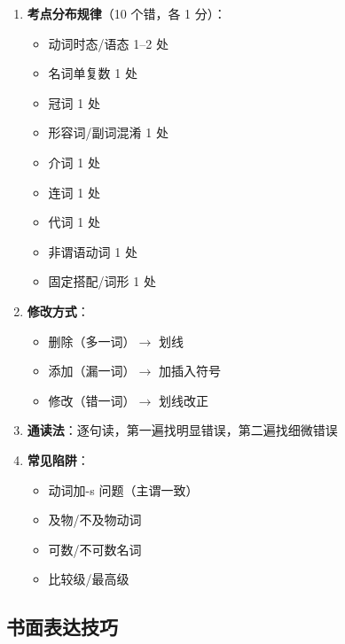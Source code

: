 \begin{enumerate}
  \item \textbf{考点分布规律}（10 个错，各 1 分）：
    \begin{itemize}
      \item 动词时态/语态 1--2 处
      \item 名词单复数 1 处
      \item 冠词 1 处
      \item 形容词/副词混淆 1 处
      \item 介词 1 处
      \item 连词 1 处
      \item 代词 1 处
      \item 非谓语动词 1 处
      \item 固定搭配/词形 1 处
    \end{itemize}
  \item \textbf{修改方式}：
    \begin{itemize}
      \item 删除（多一词）$\rightarrow$ 划线
      \item 添加（漏一词）$\rightarrow$ 加插入符号
      \item 修改（错一词）$\rightarrow$ 划线改正
    \end{itemize}
  \item \textbf{通读法}：逐句读，第一遍找明显错误，第二遍找细微错误
  \item \textbf{常见陷阱}：
    \begin{itemize}
      \item 动词加-s 问题（主谓一致）
      \item 及物/不及物动词
      \item 可数/不可数名词
      \item 比较级/最高级
    \end{itemize}
\end{enumerate}

\subsection{书面表达技巧}

